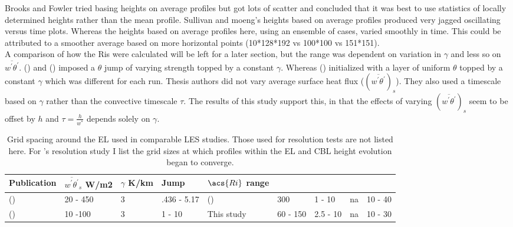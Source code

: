 Brooks and Fowler tried basing heights on average profiles but got lots of scatter and concluded that it was best to use statistics of locally determined heights rather than the mean profile.  Sullivan and moeng's heights based on average profiles produced very jagged oscillating versus time plots. Whereas the heights based on average profiles here, using an ensemble of cases, varied smoothly in time.  This could be attributed to a smoother average based on more horizontal points (10*128*192 vs 100*100 vs 151*151).\\

A comparison of how the \acs{Ri}s were calculated will be left for a later section, but the range was dependent on variation in $\gamma$ and less so on $\overline{w^{'}\theta^{'}}$.  \citeauthor{BrooksFowler2} (\citeyear{BrooksFowler2}) and \citeauthor{SullMoengStev} (\citeyear{SullMoengStev}) imposed a $\theta$ jump of varying strength topped by a constant $\gamma$.  Whereas \citeauthor{FedConzMir04} (\citeyear{FedConzMir04}) initialized with a layer of uniform $\theta$ topped by a constant $\gamma$ which was different for each run.  Thesis authors did not vary average surface heat flux ($(\overline{w^{'}\theta^{'}})_{s}$).  They also used a timescale based on $\gamma$ rather than the convective timescale $\tau$.  The results of this study support this, in that the effects of varying $(\overline{w^{'}\theta^{'}})_{s}$ seem to be offset by $h$ and $\tau = \frac{h}{w^{*}}$ depends solely on $\gamma$.\\    

\begin{table}[htbp]
\caption[]{Grid spacing around the \acs{EL} used in comparable \acs{LES} studies. Those used for resolution tests are not listed here.  For \citeauthor{SullPat}'s \citeyear{SullPat} resolution study I list the grid sizes at which profiles within the \acs{EL} and \acs{CBL} height evolution began to converge.}

    \begin{center}
    \begin{tabular}{ p{5cm} p{2cm} p{2cm} p{2cm} p{2cm}}
Publication & $\overline{w^{'}\theta^{'}}_{s}$ W/m2& $\gamma$ K/km & Jump & $\acs{Ri}$ range \\ \hline
      \citeauthor{SullMoengStev} (\citeyear{SullMoengStev}) & 20 - 450& 3  &.436 - 5.17 &
      \citeauthor{FedConzMir04} (\citeyear{FedConzMir04}) & 300 & 1 - 10 & na & 10 - 40\\ [.3cm] %
      \citeauthor{BrooksFowler2} (\citeyear{BrooksFowler2}) &  10 -100 &  3& 1 - 10 &%
      This study & 60 - 150 & 2.5 - 10& na & 10 - 30\\ \hline 
      
    \end{tabular}
\label{table:initconditcomp}   
\end{center}    
\end{table}



